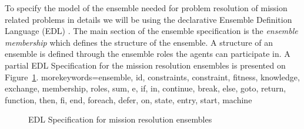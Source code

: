 \documentclass[journal]{IEEEtran}
\theoremstyle{definition}
\begin{document}
To specify the model of the ensemble needed for problem resolution of mission related problems in details we will be  using the declarative Ensemble
Definition Language (EDL) \cite{bures2015towards}.
The main section of the ensemble specification is
the \textit{ensemble membership} which defines the
structure of the ensemble.
A structure of an ensemble is defined through the ensemble
roles the agents can participate in. A partial EDL Specification for the mission resolution ensembles is presented on Figure~\ref{lstEDLMission}.
 {morekeywords={ensemble, id, constraints, constraint, fitness, knowledge, exchange, membership, roles, sum, e, if, in, continue, break, else, goto, return, function, then, fi, end, foreach, defer, on, state, entry, start, machine }}
\lstset{mathescape=true, keywordstyle=\bfseries\underbar, tabsize=1, commentstyle=\itshape, numbers=left, numberstyle=\tiny, %
numbersep=1em}
\vspace{-0.5cm}
\begin{center}
\begin{figure}[!h]
 
%  
\vspace{-0.2cm}
 \caption{EDL Specification for mission resolution ensembles} 
 \label {lstEDLMission}
\vspace{-0.7cm}
\end{figure} 
\end{center} 
 
\end{document}
